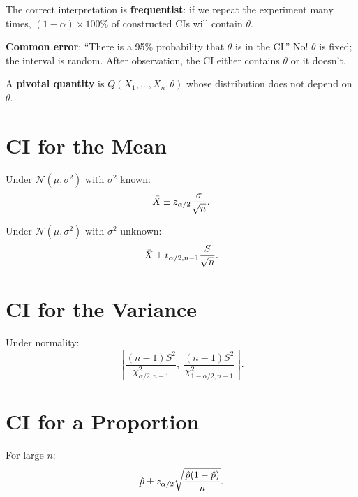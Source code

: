 \begin{warning}
The correct interpretation is \textbf{frequentist}: if we repeat the experiment many times, $(1-\alpha)\times 100\%$ of constructed CIs will contain $\theta$.

\textbf{Common error}: ``There is a 95\% probability that $\theta$ is in the CI.'' No! $\theta$ is fixed; the interval is random. After observation, the CI either contains $\theta$ or it doesn't.
\end{warning}

\begin{definition}
A \textbf{pivotal quantity} is $Q(X_1,\ldots,X_n,\theta)$ whose distribution does not depend on $\theta$.
\end{definition}

\section{CI for the Mean}

\begin{theorem}
Under $\mathcal{N}(\mu,\sigma^2)$ with $\sigma^2$ known:
\[
\bar{X} \pm z_{\alpha/2}\frac{\sigma}{\sqrt{n}}.
\]
\end{theorem}

\begin{theorem}
Under $\mathcal{N}(\mu,\sigma^2)$ with $\sigma^2$ unknown:
\[
\bar{X} \pm t_{\alpha/2,n-1}\frac{S}{\sqrt{n}}.
\]
\end{theorem}

\section{CI for the Variance}

\begin{theorem}
Under normality:
\[
\left[\frac{(n-1)S^2}{\chi^2_{\alpha/2,n-1}},\;\frac{(n-1)S^2}{\chi^2_{1-\alpha/2,n-1}}\right].
\]
\end{theorem}

\section{CI for a Proportion}

\begin{theorem}[Wald CI]
For large $n$:
\[
\hat{p} \pm z_{\alpha/2}\sqrt{\frac{\hat{p}(1-\hat{p})}{n}}.
\]
\end{theorem}

